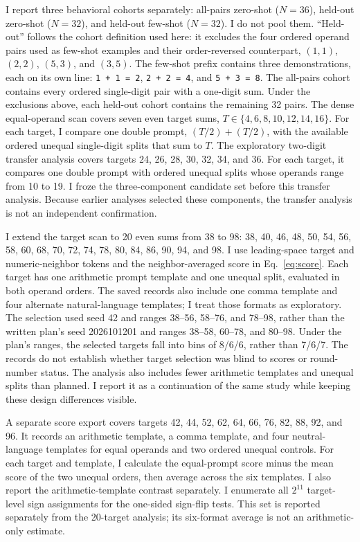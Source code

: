 \documentclass[11pt]{article}
\begin{document}
I report three behavioral cohorts separately: all-pairs zero-shot ($N=36$), held-out zero-shot ($N=32$), and held-out few-shot ($N=32$). I do not pool them. “Held-out” follows the cohort definition used here: it excludes the four ordered operand pairs used as few-shot examples and their order-reversed counterpart, $(1,1)$, $(2,2)$, $(5,3)$, and $(3,5)$. The few-shot prefix contains three demonstrations, each on its own line: \texttt{1 + 1 = 2}, \texttt{2 + 2 = 4}, and \texttt{5 + 3 = 8}. The all-pairs cohort contains every ordered single-digit pair with a one-digit sum. Under the exclusions above, each held-out cohort contains the remaining 32 pairs. The dense equal-operand scan covers seven even target sums, $T\in\{4,6,8,10,12,14,16\}$. For each target, I compare one double prompt, $(T/2)+(T/2)$, with the available ordered unequal single-digit splits that sum to $T$. The exploratory two-digit transfer analysis covers targets 24, 26, 28, 30, 32, 34, and 36. For each target, it compares one double prompt with ordered unequal splits whose operands range from 10 to 19. I froze the three-component candidate set before this transfer analysis. Because earlier analyses selected these components, the transfer analysis is not an independent confirmation.

I extend the target scan to 20 even sums from 38 to 98: 38, 40, 46, 48, 50, 54, 56, 58, 60, 68, 70, 72, 74, 78, 80, 84, 86, 90, 94, and 98. I use leading-space target and numeric-neighbor tokens and the neighbor-averaged score in Eq.~\ref{eq:score}. Each target has one arithmetic prompt template and one unequal split, evaluated in both operand orders. The saved records also include one comma template and four alternate natural-language templates; I treat those formats as exploratory. The selection used seed 42 and ranges 38--56, 58--76, and 78--98, rather than the written plan's seed 2026101201 and ranges 38--58, 60--78, and 80--98. Under the plan's ranges, the selected targets fall into bins of 8/6/6, rather than 7/6/7. The records do not establish whether target selection was blind to scores or round-number status. The analysis also includes fewer arithmetic templates and unequal splits than planned. I report it as a continuation of the same study while keeping these design differences visible.

A separate score export covers targets 42, 44, 52, 62, 64, 66, 76, 82, 88, 92, and 96. It records an arithmetic template, a comma template, and four neutral-language templates for equal operands and two ordered unequal controls. For each target and template, I calculate the equal-prompt score minus the mean score of the two unequal orders, then average across the six templates. I also report the arithmetic-template contrast separately. I enumerate all $2^{11}$ target-level sign assignments for the one-sided sign-flip tests. This set is reported separately from the 20-target analysis; its six-format average is not an arithmetic-only estimate.
\end{document}
